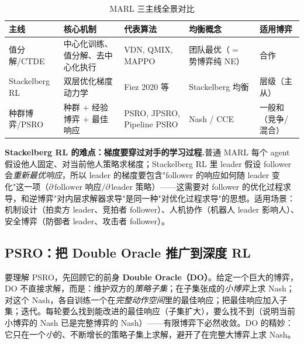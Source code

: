 \begin{table}[H]\centering\small
\caption{MARL 三主线全景对比}
\label{tab:sm-marl-lines}
\begin{tabular}{p{} p{} p{} p{} p{}}
\toprule
主线 & 核心机制 & 代表算法 & 均衡概念 & 适用博弈 \\
\midrule
值分解/CTDE & 中心化训练、值分解、去中心化执行 & VDN, QMIX, MAPPO & 团队最优（$=$ 势博弈纯 NE） & 合作 \\
Stackelberg RL & 双层优化梯度动力学 & Fiez 2020 等 & Stackelberg 均衡 & 层级（主从） \\
种群博弈/PSRO & 种群 $+$ 经验博弈 $+$ 最佳响应 & PSRO, JPSRO, Pipeline PSRO & Nash / CCE & 一般和（竞争/混合） \\
\bottomrule
\end{tabular}
\end{table}

\begin{note}
\textbf{Stackelberg RL 的难点：梯度要穿过对手的学习过程.}\;普通 MARL 每个 agent 假设他人固定、对当前他人策略求梯度；Stackelberg RL 里 leader 假设 follower 会\emph{重新最优响应}，所以 leader 的梯度要包含"follower 的响应如何随 leader 变化"这一项（$\partial\,\text{follower 响应}/\partial\,\text{leader 策略}$）——这需要对 follower 的优化过程求导，和逆博弈"对内层求解器求导"是同一种"对优化过程求导"的思想。适用场景：机制设计（拍卖方 leader、竞拍者 follower）、人机协作（机器人 leader 影响人）、安全博弈（防御者 leader、攻击者 follower）。
\end{note}

\subsection{PSRO：把 Double Oracle 推广到深度 RL}
\label{sec:sm-psro-core}

要理解 PSRO，先回顾它的前身 \textbf{Double Oracle（DO）}。给定一个巨大的博弈，DO 不直接求解，而是：维护双方的\emph{策略子集}；在子集张成的\emph{小博弈}上求 Nash；对这个 Nash，各自训练一个在\emph{完整动作空间}里的最佳响应；把最佳响应加入子集；迭代。每轮要么找到能改进的最佳响应（子集扩大），要么找不到（说明当前小博弈的 Nash 已是完整博弈的 Nash）——有限博弈下必然收敛。DO 的精妙：它只在一个\emph{小}的、不断增长的策略子集上求解，避开了在完整大博弈上求 Nash。

